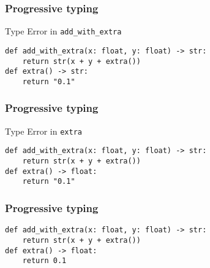 \begin{frame}[fragile]
\frametitle{Progressive typing}
Type Error in \verb|add_with_extra|
\begin{lstlisting}
def add_with_extra(x: float, y: float) -> str:
    return str(x + y + extra())
def extra() -> str:
    return "0.1"
\end{lstlisting}
\end{frame}

\begin{frame}[fragile]
\frametitle{Progressive typing}
Type Error in \verb|extra|
\begin{lstlisting}
def add_with_extra(x: float, y: float) -> str:
    return str(x + y + extra())
def extra() -> float:
    return "0.1"
\end{lstlisting}
\end{frame}

\begin{frame}[fragile]
\frametitle{Progressive typing}
\begin{lstlisting}
def add_with_extra(x: float, y: float) -> str:
    return str(x + y + extra())
def extra() -> float:
    return 0.1
\end{lstlisting}
\end{frame}


